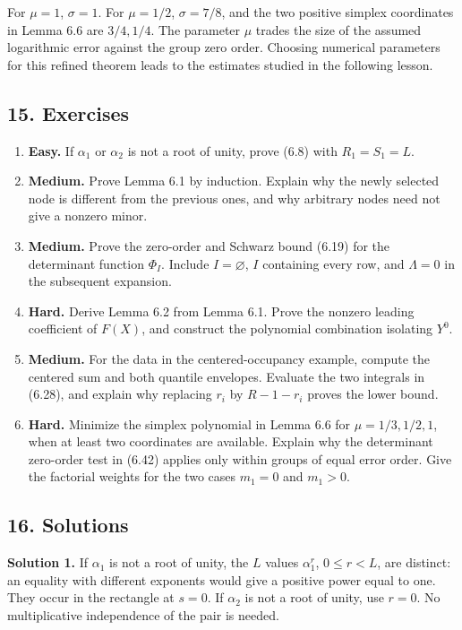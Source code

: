 \documentclass[
  11pt,
  a4paper,
]{article}
\begin{document}
For \(\mu=1\), \(\sigma=1\). For \(\mu=1/2\), \(\sigma=7/8\), and the
two positive simplex coordinates in Lemma 6.6 are \(3/4,1/4\). The
parameter \(\mu\) trades the size of the assumed logarithmic error
against the group zero order. Choosing numerical parameters for this
refined theorem leads to the estimates studied in the following lesson.

\subsection{15. Exercises}\label{exercises}

\begin{enumerate}
\def\labelenumi{\arabic{enumi}.}
\item
  \textbf{Easy.} If \(\alpha_1\) or \(\alpha_2\) is not a root of unity,
  prove (6.8) with \(R_1=S_1=L\).
\item
  \textbf{Medium.} Prove Lemma 6.1 by induction. Explain why the newly
  selected node is different from the previous ones, and why arbitrary
  nodes need not give a nonzero minor.
\item
  \textbf{Medium.} Prove the zero-order and Schwarz bound (6.19) for the
  determinant function \(\Phi_I\). Include \(I=\varnothing\), \(I\)
  containing every row, and \(\Lambda=0\) in the subsequent expansion.
\item
  \textbf{Hard.} Derive Lemma 6.2 from Lemma 6.1. Prove the nonzero
  leading coefficient of \(F(X)\), and construct the polynomial
  combination isolating \(Y^0\).
\item
  \textbf{Medium.} For the data in the centered-occupancy example,
  compute the centered sum and both quantile envelopes. Evaluate the two
  integrals in (6.28), and explain why replacing \(r_i\) by \(R-1-r_i\)
  proves the lower bound.
\item
  \textbf{Hard.} Minimize the simplex polynomial in Lemma 6.6 for
  \(\mu=1/3,1/2,1\), when at least two coordinates are available.
  Explain why the determinant zero-order test in (6.42) applies only
  within groups of equal error order. Give the factorial weights for the
  two cases \(m_1=0\) and \(m_1>0\).
\end{enumerate}

\subsection{16. Solutions}\label{solutions}

\textbf{Solution 1.} If \(\alpha_1\) is not a root of unity, the \(L\)
values \(\alpha_1^r\), \(0\le r<L\), are distinct: an equality with
different exponents would give a positive power equal to one. They occur
in the rectangle at \(s=0\). If \(\alpha_2\) is not a root of unity, use
\(r=0\). No multiplicative independence of the pair is needed.
\end{document}
